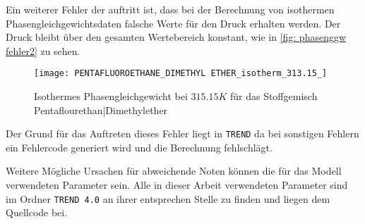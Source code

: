 \documentclass[../thesis.tex]{subfiles}
\begin{document}
Ein weiterer Fehler der auftritt ist, dass bei der Berechnung von isothermen Phasengleichgewichtsdaten falsche Werte für den Druck erhalten werden. Der Druck bleibt über den gesamten Wertebereich konstant, wie in \autoref{fig: phasenggw fehler2} zu sehen.

\begin{figure}[htb]
	\centering
	\texttt{[image: PENTAFLUOROETHANE\_DIMETHYL ETHER\_isotherm\_313.15\_]}
	\caption{Isothermes Phasengleichgewicht bei $ 315$.$15 K$ für das Stoffgemisch Pentaflourethan|Dimethylether}
	\label{fig: phasenggw fehler2}
\end{figure}
Der Grund für das Auftreten dieses Fehler liegt in \texttt{TREND} da bei sonstigen Fehlern ein Fehlercode generiert wird und die Berechnung fehlschlägt. 

Weitere Mögliche Ursachen für abweichende Noten können die für das Modell verwendeten Parameter sein. Alle in dieser Arbeit verwendeten Parameter sind im Ordner \texttt{TREND 4.0} an ihrer entsprechen Stelle zu finden und liegen dem Quellcode bei.
\end{document}
